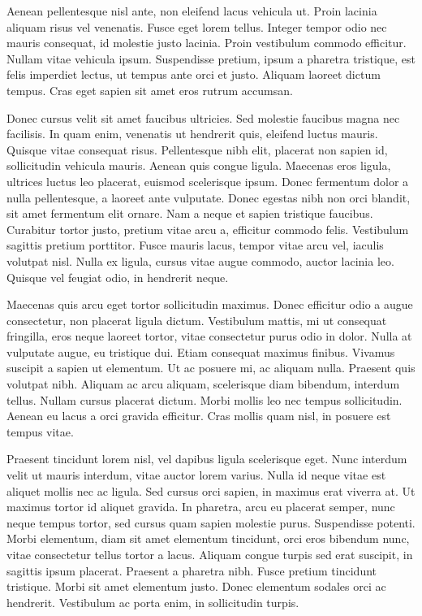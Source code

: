 Aenean pellentesque nisl ante, non eleifend lacus vehicula ut. Proin lacinia aliquam risus vel venenatis. Fusce eget lorem tellus. Integer tempor odio nec mauris consequat, id molestie justo lacinia. Proin vestibulum commodo efficitur. Nullam vitae vehicula ipsum. Suspendisse pretium, ipsum a pharetra tristique, est felis imperdiet lectus, ut tempus ante orci et justo. Aliquam laoreet dictum tempus. Cras eget sapien sit amet eros rutrum accumsan.

Donec cursus velit sit amet faucibus ultricies. Sed molestie faucibus magna nec facilisis. In quam enim, venenatis ut hendrerit quis, eleifend luctus mauris. Quisque vitae consequat risus. Pellentesque nibh elit, placerat non sapien id, sollicitudin vehicula mauris. Aenean quis congue ligula. Maecenas eros ligula, ultrices luctus leo placerat, euismod scelerisque ipsum. Donec fermentum dolor a nulla pellentesque, a laoreet ante vulputate. Donec egestas nibh non orci blandit, sit amet fermentum elit ornare. Nam a neque et sapien tristique faucibus. Curabitur tortor justo, pretium vitae arcu a, efficitur commodo felis. Vestibulum sagittis pretium porttitor. Fusce mauris lacus, tempor vitae arcu vel, iaculis volutpat nisl. Nulla ex ligula, cursus vitae augue commodo, auctor lacinia leo. Quisque vel feugiat odio, in hendrerit neque.

Maecenas quis arcu eget tortor sollicitudin maximus. Donec efficitur odio a augue consectetur, non placerat ligula dictum. Vestibulum mattis, mi ut consequat fringilla, eros neque laoreet tortor, vitae consectetur purus odio in dolor. Nulla at vulputate augue, eu tristique dui. Etiam consequat maximus finibus. Vivamus suscipit a sapien ut elementum. Ut ac posuere mi, ac aliquam nulla. Praesent quis volutpat nibh. Aliquam ac arcu aliquam, scelerisque diam bibendum, interdum tellus. Nullam cursus placerat dictum. Morbi mollis leo nec tempus sollicitudin. Aenean eu lacus a orci gravida efficitur. Cras mollis quam nisl, in posuere est tempus vitae.

Praesent tincidunt lorem nisl, vel dapibus ligula scelerisque eget. Nunc interdum velit ut mauris interdum, vitae auctor lorem varius. Nulla id neque vitae est aliquet mollis nec ac ligula. Sed cursus orci sapien, in maximus erat viverra at. Ut maximus tortor id aliquet gravida. In pharetra, arcu eu placerat semper, nunc neque tempus tortor, sed cursus quam sapien molestie purus. Suspendisse potenti. Morbi elementum, diam sit amet elementum tincidunt, orci eros bibendum nunc, vitae consectetur tellus tortor a lacus. Aliquam congue turpis sed erat suscipit, in sagittis ipsum placerat. Praesent a pharetra nibh. Fusce pretium tincidunt tristique. Morbi sit amet elementum justo. Donec elementum sodales orci ac hendrerit. Vestibulum ac porta enim, in sollicitudin turpis.

